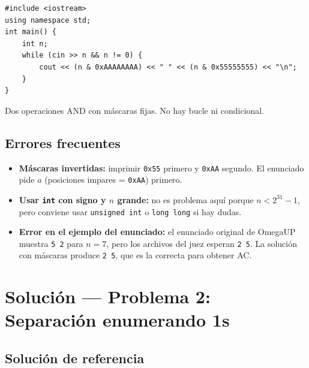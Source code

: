 \documentclass[12pt, oneside]{article}
\begin{document}
\begin{notaprofesor}
\begin{verbatim}
#include <iostream>
using namespace std;
int main() {
    int n;
    while (cin >> n && n != 0) {
        cout << (n & 0xAAAAAAAA) << " " << (n & 0x55555555) << "\n";
    }
}
\end{verbatim}
  Dos operaciones AND con máscaras fijas.  No hay bucle ni condicional.
\end{notaprofesor}

\subsection{Errores frecuentes}

\begin{notaprofesor}
  \begin{itemize}
    \item \textbf{Máscaras invertidas:} imprimir \texttt{0x55} primero y
          \texttt{0xAA} segundo.  El enunciado pide $a$ (posiciones impares =
          \texttt{0xAA}) primero.
    \item \textbf{Usar \texttt{int} con signo y $n$ grande:} no es problema
          aquí porque $n < 2^{31}-1$, pero conviene usar \texttt{unsigned int}
          o \texttt{long long} si hay dudas.
    \item \textbf{Error en el ejemplo del enunciado:} el enunciado original de
          OmegaUP muestra \texttt{5 2} para $n=7$, pero los archivos del juez
          esperan \texttt{2 5}.  La solución con máscaras produce \texttt{2 5},
          que es la correcta para obtener AC.
  \end{itemize}
\end{notaprofesor}

\newpage

\section{Solución — Problema 2: Separación enumerando 1s}

\subsection{Solución de referencia}
\end{document}
